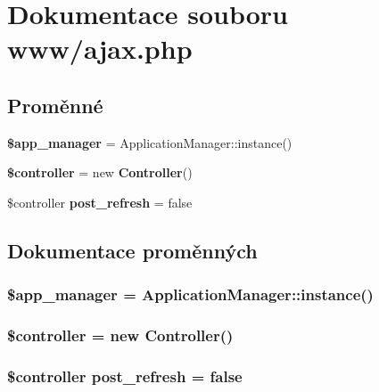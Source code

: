 \section{Dokumentace souboru www/ajax.php}
\label{de/dae/ajax_8php}
\subsection*{Proměnné}
\begin{DoxyCompactItemize}
\item 
{\bf \$app\_\-manager} = ApplicationManager::instance()
\item 
{\bf \$controller} = new {\bf Controller}()
\item 
\$controller {\bf post\_\-refresh} = false
\end{DoxyCompactItemize}


\subsection{Dokumentace proměnných}
\subsubsection[{\$app\_\-manager}]{\setlength{\rightskip}{0pt plus 5cm}\$app\_\-manager = ApplicationManager::instance()}\label{de/dae/ajax_8php_ae90535e0d6f8ef2796b9df91694cc337}
\subsubsection[{\$controller}]{\setlength{\rightskip}{0pt plus 5cm}\$controller = new {\bf Controller}()}\label{de/dae/ajax_8php_a388ef7b1db5e6f728e63cee704ce6e23}
\subsubsection[{post\_\-refresh}]{\setlength{\rightskip}{0pt plus 5cm}\$controller {\bf post\_\-refresh} = false}\label{de/dae/ajax_8php_ae8454d15b431555b0cd267517c3e205e}
